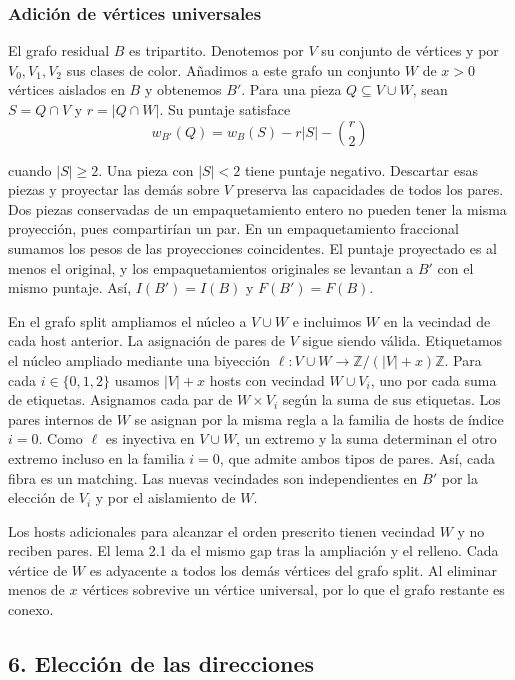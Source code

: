 \documentclass[spanish,11pt,a4paper]{article}
\begin{document}
\subsubsection{Adición de vértices universales}\label{adiciuxf3n-de-vuxe9rtices-universales}

El grafo residual \(B\) es tripartito. Denotemos por \(V\) su conjunto de vértices y por \(V_0,V_1,V_2\) sus clases de color. Añadimos a este grafo un conjunto \(W\) de \(x>0\) vértices aislados en \(B\) y obtenemos \(B'\). Para una pieza \(Q\subseteq V\cup W\), sean \(S=Q\cap V\) y \(r=|Q\cap W|\). Su puntaje satisface
\[w_{B'}(Q)=w_B(S)-r|S|-\binom r2\]

cuando \(|S|\ge2\). Una pieza con \(|S|<2\) tiene puntaje negativo. Descartar esas piezas y proyectar las demás sobre \(V\) preserva las capacidades de todos los pares. Dos piezas conservadas de un empaquetamiento entero no pueden tener la misma proyección, pues compartirían un par. En un empaquetamiento fraccional sumamos los pesos de las proyecciones coincidentes. El puntaje proyectado es al menos el original, y los empaquetamientos originales se levantan a \(B'\) con el mismo puntaje. Así, \(I(B')=I(B)\) y \(F(B')=F(B)\).

En el grafo split ampliamos el núcleo a \(V\cup W\) e incluimos \(W\) en la vecindad de cada host anterior. La asignación de pares de \(V\) sigue siendo válida. Etiquetamos el núcleo ampliado mediante una biyección \(\ell:V\cup W\to\mathbb Z/(|V|+x)\mathbb Z\). Para cada \(i\in\{0,1,2\}\) usamos \(|V|+x\) hosts con vecindad \(W\cup V_i\), uno por cada suma de etiquetas. Asignamos cada par de \(W\times V_i\) según la suma de sus etiquetas. Los pares internos de \(W\) se asignan por la misma regla a la familia de hosts de índice \(i=0\). Como \(\ell\) es inyectiva en \(V\cup W\), un extremo y la suma determinan el otro extremo incluso en la familia \(i=0\), que admite ambos tipos de pares. Así, cada fibra es un matching. Las nuevas vecindades son independientes en \(B'\) por la elección de \(V_i\) y por el aislamiento de \(W\).

Los hosts adicionales para alcanzar el orden prescrito tienen vecindad \(W\) y no reciben pares. El lema 2.1 da el mismo gap tras la ampliación y el relleno. Cada vértice de \(W\) es adyacente a todos los demás vértices del grafo split. Al eliminar menos de \(x\) vértices sobrevive un vértice universal, por lo que el grafo restante es conexo.

\subsection{6. Elección de las direcciones}\label{elecciuxf3n-de-las-direcciones}
\end{document}
